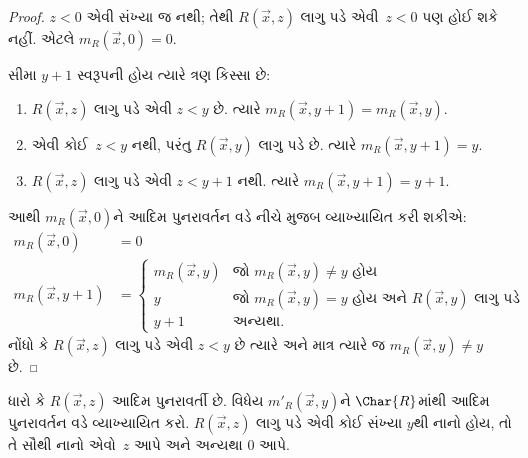 \begin{proof}
$z < 0$ એવી સંખ્યા જ નથી; તેથી $R(\vec{x}, z)$ લાગુ પડે
એવી~$z < 0$ પણ હોઈ શકે નહીં. એટલે $m_R(\vec x, 0) = 0$.

સીમા $y + 1$ સ્વરૂપની હોય ત્યારે ત્રણ કિસ્સા છે:
\begin{enumerate}
\item $R(\vec{x}, z)$ લાગુ પડે એવી $z < y$ છે. ત્યારે
$m_R(\vec{x}, y+1) = m_R(\vec{x}, y)$.
\item એવી કોઈ~$z<y$ નથી, પરંતુ $R(\vec{x}, y)$ લાગુ પડે છે.
ત્યારે $m_R(\vec{x}, y+1) = y$.
\item $R(\vec{x}, z)$ લાગુ પડે એવી $z < y+1$ નથી. ત્યારે
$m_R(\vec{x}, y+1) = y+1$.
\end{enumerate}
આથી $m_R(\vec x, 0)$ને આદિમ પુનરાવર્તન વડે નીચે મુજબ વ્યાખ્યાયિત
કરી શકીએ:
\begin{align*}
m_R(\vec{x}, 0) & = 0\\
m_R(\vec{x}, y+1) & =
\begin{cases}
m_R(\vec{x}, y) & \text{જો $m_R(\vec x, y) \neq y$ હોય}\\
y & \text{જો $m_R(\vec x, y) = y$ હોય અને $R(\vec{x}, y)$ લાગુ પડે}\\
y+1 & \text{અન્યથા.}
\end{cases}
\end{align*}
નોંધો કે $R(\vec x, z)$ લાગુ પડે એવી $z<y$ છે ત્યારે અને માત્ર
ત્યારે જ $m_R(\vec x,
y) \neq y$ છે.
\end{proof}

\begin{prob}
ધારો કે $R(\vec x, z)$ આદિમ પુનરાવર્તી છે. વિધેય
$m'_R(\vec{x}, y)$ને $\Char{R}$માંથી આદિમ પુનરાવર્તન વડે
વ્યાખ્યાયિત કરો. $R(\vec{x}, z)$ લાગુ પડે એવી કોઈ સંખ્યા $y$થી
નાનો હોય, તો તે સૌથી નાનો એવો~$z$ આપે અને અન્યથા $0$ આપે.
\end{prob}
\endgroup


\begingroup
\makeatletter{}\makeatother

\label{guunit:OLP-0219}


